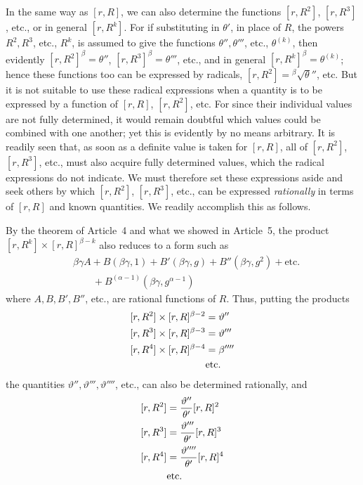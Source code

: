 In the same way as $[r,R]$, we can also determine the functions $[r,R^2]$, $[r,R^3]$, etc., or in general $[r,R^k]$. For if substituting in $\theta'$, in place of $R$, the powers $R^2,R^3$, etc., $R^k$, is assumed to give the functions $\theta'',\theta'''$, etc., $\theta^{(k)}$, then evidently $[r,R^2]^\beta=\theta''$, $[r,R^3]^\beta=\theta'''$, etc., and in general $[r,R^k]^\beta=\theta^{(k)}$; hence these functions too can be expressed by radicals, $[r,R^2]={}^{\beta}\!\surd\theta''$, etc. But it is not suitable to use these radical expressions when a quantity is to be expressed by a function of $[r,R]$, $[r,R^2]$, etc. For since their individual values are not fully determined, it would remain doubtful which values could be combined with one another; yet this is evidently by no means arbitrary. It is readily seen that, as soon as a definite value is taken for $[r,R]$, all of $[r,R^2]$, $[r,R^3]$, etc., must also acquire fully determined values, which the radical expressions do not indicate. We must therefore set these expressions aside and seek others by which $[r,R^2]$, $[r,R^3]$, etc., can be expressed \emph{rationally} in terms of $[r,R]$ and known quantities. We readily accomplish this as follows.

By the theorem of Article~4 and what we showed in Article~5, the product $[r,R^k]\times[r,R]^{\beta-k}$ also reduces to a form such as
\[
\begin{aligned}
&\beta\gamma A+B(\beta\gamma,1)+B'(\beta\gamma,g)+B''(\beta\gamma,g^2)+\text{etc.}\\
&\qquad{}+B^{(\alpha-1)}(\beta\gamma,g^{\alpha-1})
\end{aligned}
\]
where $A,B,B',B''$, etc., are rational functions of $R$. Thus, putting the products
\[
\begin{aligned}
\relax[r,R^2]\times[r,R]^{\beta-2}&=\vartheta''\\
\relax[r,R^3]\times[r,R]^{\beta-3}&=\vartheta'''\\
\relax[r,R^4]\times[r,R]^{\beta-4}&=\beta''''\\
&\text{etc.}
\end{aligned}
\]
the quantities $\vartheta'',\vartheta''',\vartheta''''$, etc., can also be determined rationally, and
\[
\begin{aligned}
\relax[r,R^2]&=\frac{\vartheta''}{\theta'}[r,R]^2\\
\relax[r,R^3]&=\frac{\vartheta'''}{\theta'}[r,R]^3\\
\relax[r,R^4]&=\frac{\vartheta''''}{\theta'}[r,R]^4\\
&\text{etc.}
\end{aligned}
\]

